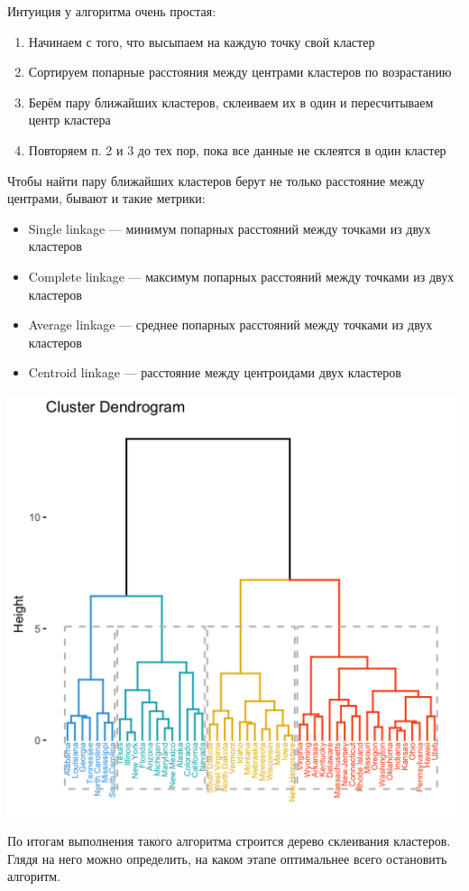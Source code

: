 Интуиция у алгоритма очень простая:
\begin{enumerate}
    \item Начинаем с того, что высыпаем на каждую точку свой кластер
    \item  Сортируем попарные расстояния между центрами кластеров по возрастанию
    \item  Берём пару ближайших кластеров, склеиваем их в один и пересчитываем центр кластера
    \item  Повторяем п. 2 и 3 до тех пор, пока все данные не склеятся в один кластер
\end{enumerate}
Чтобы найти пару ближайших кластеров берут не только расстояние между центрами, бывают и такие метрики:
\begin{itemize}
    \item Single linkage — минимум попарных расстояний между точками из двух кластеров
    \item Complete linkage — максимум попарных расстояний между точками из двух кластеров
    \item Average linkage — среднее попарных расстояний между точками из двух кластеров
    \item Centroid linkage — расстояние между центроидами двух кластеров
\end{itemize}

\begin{center}
    \includegraphics[scale=0.3]{tickets/pictures/agg_clus.jpg}
\end{center}

По итогам выполнения такого алгоритма строится дерево склеивания кластеров. Глядя на него можно определить, на каком этапе оптимальнее всего остановить алгоритм.